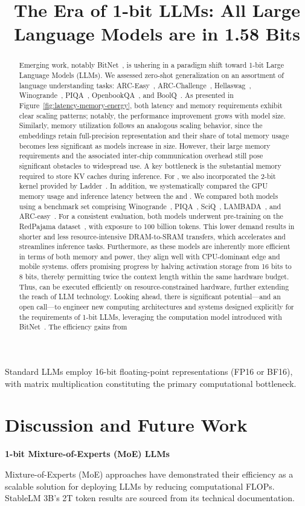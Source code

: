 \title{The Era of 1-bit LLMs: All Large Language Models are in 1.58 Bits}
Standard LLMs employ 16-bit floating-point representations (FP16 or BF16), with matrix multiplication constituting the primary computational bottleneck. \section{Discussion and Future Work}

\textbf{1-bit Mixture-of-Experts (MoE) LLMs}

Mixture-of-Experts (MoE) approaches have demonstrated their efficiency as a scalable solution for deploying LLMs by reducing computational FLOPs. StableLM 3B’s 2T token results are sourced from its technical documentation. 
\begin{abstract}
Emerging work, notably BitNet~\cite{bitnet}, is ushering in a paradigm shift toward 1-bit Large Language Models (LLMs). We assessed zero-shot generalization on an assortment of language understanding tasks: ARC-Easy~\cite{arc}, ARC-Challenge~\cite{arc}, Hellaswag~\cite{hellaswag}, Winogrande~\cite{winoGrande}, PIQA~\cite{piqa}, OpenbookQA~\cite{openbookqa}, and BoolQ~\cite{boolq}. As presented in Figure~\ref{fig:latency-memory-energy}, both latency and memory requirements exhibit clear scaling patterns; notably, the performance improvement grows with model size. Similarly, memory utilization follows an analogous scaling behavior, since the embeddings retain full-precision representation and their share of total memory usage becomes less significant as models increase in size. However, their large memory requirements and the associated inter-chip communication overhead still pose significant obstacles to widespread use. A key bottleneck is the substantial memory required to store KV caches during inference. For , we also incorporated the 2-bit kernel provided by Ladder~\cite{ladder}. In addition, we systematically compared the GPU memory usage and inference latency between the  and . We compared both models using a benchmark set comprising Winogrande~\cite{winoGrande}, PIQA~\cite{piqa}, SciQ~\cite{sciq}, LAMBADA~\cite{lambada}, and ARC-easy~\cite{arc}. For a consistent evaluation, both models underwent pre-training on the RedPajama dataset~\cite{redpajama}, with exposure to 100 billion tokens. This lower demand results in shorter and less resource-intensive DRAM-to-SRAM transfers, which accelerates and streamlines inference tasks. Furthermore, as these models are inherently more efficient in terms of both memory and power, they align well with CPU-dominant edge and mobile systems.  offers promising progress by halving activation storage from 16 bits to 8 bits, thereby permitting twice the context length within the same hardware budget. Thus,  can be executed efficiently on resource-constrained hardware, further extending the reach of LLM technology. Looking ahead, there is significant potential—and an open call—to engineer new computing architectures and systems designed explicitly for the requirements of 1-bit LLMs, leveraging the computation model introduced with BitNet~\cite{bitnet}. The efficiency gains from 
\end{abstract}

